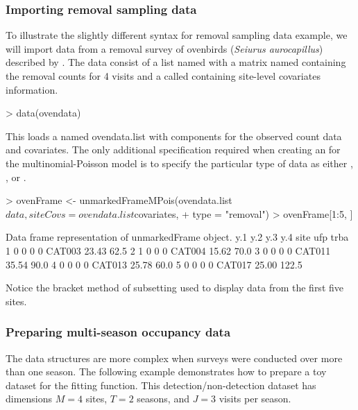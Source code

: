 \documentclass[article,shortnames]{jss}
\begin{document}
{\subsubsection{Importing removal sampling data}

To illustrate the slightly different syntax for removal sampling data example, 
we will import data from a removal survey of ovenbirds 
({\it Seiurus aurocapillus}) described by \citet{Royle2004a}.  The data consist 
of a list named  with 
a matrix named  containing the removal counts for 4 visits and a 
 called  containing site-level covariates 
information.

\begin{Schunk}
\begin{Sinput}
> data(ovendata)
\end{Sinput}
\end{Schunk}

This loads a  named ovendata.list with components for the 
observed count data and covariates.  The only additional specification 
required when creating an  for the multinomial-Poisson
model is to specify the particular type of data as either 
, , or .

\begin{Schunk}
\begin{Sinput}
> ovenFrame <- unmarkedFrameMPois(ovendata.list$data, siteCovs = ovendata.list$covariates, 
+     type = "removal")
> ovenFrame[1:5, ]
\end{Sinput}
\begin{Soutput}
Data frame representation of unmarkedFrame object.
  y.1 y.2 y.3 y.4   site   ufp  trba
1   0   0   0   0 CAT003 23.43  62.5
2   1   0   0   0 CAT004 15.62  70.0
3   0   0   0   0 CAT011 35.54  90.0
4   0   0   0   0 CAT013 25.78  60.0
5   0   0   0   0 CAT017 25.00 122.5
\end{Soutput}
\end{Schunk}

Notice the bracket method of subsetting used to display data from the first 
five sites.

\subsubsection{Preparing multi-season occupancy data}

The data structures are more complex when surveys were conducted over more 
than one season. The following example demonstrates how to prepare a toy 
dataset for the  fitting function. This detection/non-detection
dataset has dimensions $M=4$ sites, $T=2$ seasons, and $J=3$ visits per season. 


}
\end{document}
